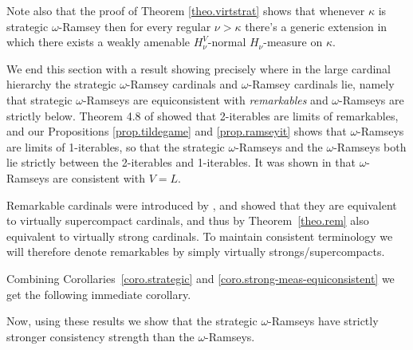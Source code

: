\documentclass[../../main]{subfiles}
\begin{document}
Note also that the proof of Theorem \ref{theo.virtstrat} shows that whenever $\kappa$ is strategic $\omega$-Ramsey then for every regular $\nu>\kappa$ there's a generic extension in which there exists a weakly amenable $H_\nu^V$-normal $H_\nu$-measure on $\kappa$.

\qquad We end this section with a result showing precisely where in the large cardinal hierarchy the strategic $\omega$-Ramsey cardinals and $\omega$-Ramsey cardinals lie, namely that strategic $\omega$-Ramseys are equiconsistent with \textit{remarkables} and $\omega$-Ramseys are strictly below. Theorem 4.8 of \cite{Ramsey2} showed that 2-iterables are limits of remarkables, and our Propositions \ref{prop.tildegame} and \ref{prop.ramseyit} shows that $\omega$-Ramseys are limits of 1-iterables, so that the strategic $\omega$-Ramseys and the $\omega$-Ramseys both lie strictly between the 2-iterables and 1-iterables. It was shown in \cite{HolySchlicht} that $\omega$-Ramseys are consistent with $V=L$.

\qquad Remarkable cardinals were introduced by \cite{remarkable}, and \cite{GitmanSchindler} showed that they are equivalent to virtually supercompact cardinals, and thus by Theorem~\ref{theo.rem} also equivalent to virtually strong cardinals. To maintain consistent terminology we will therefore denote remarkables by simply virtually strongs/supercompacts.

\qquad Combining Corollaries~\ref{coro.strategic} and \ref{coro.strong-meas-equiconsistent} we get the following immediate corollary.


Now, using these results we show that the strategic $\omega$-Ramseys have strictly stronger consistency strength than the $\omega$-Ramseys.
\end{document}
